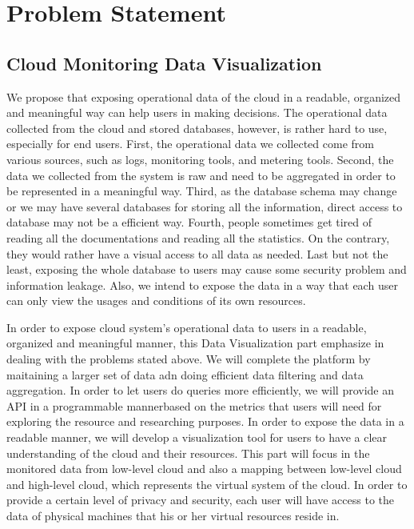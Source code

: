 \section{Problem Statement}
\label{sec:ProblemStatement}



\subsection{Cloud Monitoring Data Visualization}
  We propose that exposing operational data of the cloud in a readable, organized and meaningful way can help users in making decisions. The operational data collected from the cloud and stored databases, however, is rather hard to use, especially for end users. First, the operational data we collected come from various sources, such as logs, monitoring tools, and metering tools. Second, the data we collected from the system is raw and need to be aggregated in order to be represented in a meaningful way. Third, as the database schema may change or we may have several databases for storing all the information, direct access to database may not be a efficient way. Fourth, people sometimes get tired of reading all the documentations and reading all the statistics. On the contrary, they would rather have a visual access to all data as needed. Last but not the least, exposing the whole database to users may cause some security problem and information leakage. Also, we intend to expose the data in a way that each user can only view the usages and conditions of its own resources.  

  In order to expose cloud system's operational data to users in a readable, organized and meaningful manner, this Data Visualization part emphasize in dealing with the problems stated above. We will complete the platform by  maitaining a larger set of data adn doing efficient data filtering and data aggregation. In order to let users do queries more efficiently, we will provide an API in a programmable mannerbased on the metrics that users will need for exploring the resource and researching purposes. In order to expose the data in a readable manner, we will develop a visualization tool for users to have a clear understanding of the cloud and their resources. This part will focus in the monitored data from low-level cloud and also a mapping between low-level cloud and high-level cloud, which represents the virtual system of the cloud. In order to provide a certain level of privacy and security, each user will have access to the data of physical machines that his or her virtual resources reside in. 